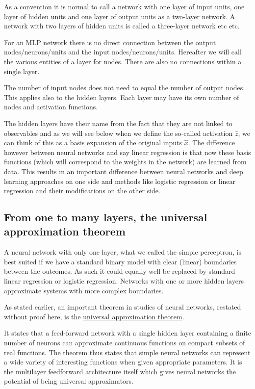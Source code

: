 \documentclass[11pt]{article}
\begin{document}
As a convention it is normal to call a network with one layer of input
units, one layer of hidden units and one layer of output units as a
two-layer network. A network with two layers of hidden units is called a
three-layer network etc etc.

For an MLP network there is no direct connection between the output
nodes/neurons/units and the input nodes/neurons/units. Hereafter we will
call the various entities of a layer for nodes. There are also no
connections within a single layer.

The number of input nodes does not need to equal the number of output
nodes. This applies also to the hidden layers. Each layer may have its
own number of nodes and activation functions.

The hidden layers have their name from the fact that they are not linked
to observables and as we will see below when we define the so-called
activation \(\hat{z}\), we can think of this as a basis expansion of the
original inputs \(\hat{x}\). The difference however between neural
networks and say linear regression is that now these basis functions
(which will correspond to the weights in the network) are learned from
data. This results in an important difference between neural networks
and deep learning approaches on one side and methods like logistic
regression or linear regression and their modifications on the other
side.

\hypertarget{from-one-to-many-layers-the-universal-approximation-theorem}{%
\subsection{From one to many layers, the universal approximation
theorem}\label{from-one-to-many-layers-the-universal-approximation-theorem}}

A neural network with only one layer, what we called the simple
perceptron, is best suited if we have a standard binary model with clear
(linear) boundaries between the outcomes. As such it could equally well
be replaced by standard linear regression or logistic regression.
Networks with one or more hidden layers approximate systems with more
complex boundaries.

As stated earlier, an important theorem in studies of neural networks,
restated without proof here, is the
\href{http://citeseerx.ist.psu.edu/viewdoc/download?doi=10.1.1.441.7873\&rep=rep1\&type=pdf}{universal
approximation theorem}.

It states that a feed-forward network with a single hidden layer
containing a finite number of neurons can approximate continuous
functions on compact subsets of real functions. The theorem thus states
that simple neural networks can represent a wide variety of interesting
functions when given appropriate parameters. It is the multilayer
feedforward architecture itself which gives neural networks the
potential of being universal approximators.
\end{document}
